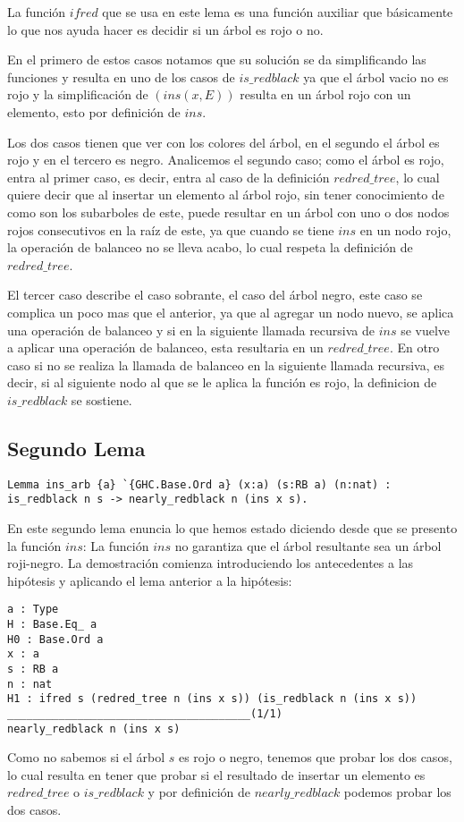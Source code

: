 \documentclass[letterpaper,12pt,oneside]{book}
\newcommand{\arn}{árbol roji-negro}
\theoremstyle{plain}
\theoremstyle{definition}
\theoremstyle{remark}
\begin{document}
 La funci\'on $ifred$ que se usa en este lema es una funci\'on auxiliar que b\'asicamente lo que nos ayuda hacer es decidir si un \'arbol es 
 rojo o no. 

 En el primero de estos casos notamos que su soluci\'on se da simplificando las funciones y resulta en uno de los casos
 de $is\_redblack$ ya que el \'arbol vacio no es rojo y la simplificaci\'on de $(ins(x,E))$ resulta en un \'arbol rojo con un elemento,
 esto por definici\'on de $ins$.

 Los dos casos tienen que ver con los colores del \'arbol, en el segundo el \'arbol es rojo y en el tercero es negro.
 Analicemos el segundo caso; como el \'arbol es rojo, entra al primer caso, es decir, entra al caso de la definici\'on $redred\_tree$,
 lo cual quiere decir que al insertar un elemento al \'arbol rojo, sin tener conocimiento de como son los subarboles de este, puede
 resultar en un \'arbol con uno o dos nodos rojos consecutivos en la ra\'iz de este, ya que cuando se tiene $ins$ en un nodo rojo, la operaci\'on de 
 balanceo no se lleva acabo, lo cual respeta la definici\'on de $redred\_tree$.

 El tercer caso describe el caso sobrante, el caso del \'arbol negro, este caso se complica un poco mas que el anterior, ya que al 
 agregar un nodo nuevo, se aplica una operaci\'on de balanceo y si en la siguiente llamada recursiva de $ins$ se vuelve a aplicar una operaci\'on 
 de balanceo, esta resultaria en un $redred\_tree$. En otro caso si no se realiza la llamada de balanceo en la siguiente llamada recursiva, es decir, si al siguiente nodo al que se le aplica la funci\'on es rojo, la definicion de $is\_redblack$ se sostiene.
\subsection{Segundo Lema}
\begin{verbatim}
Lemma ins_arb {a} `{GHC.Base.Ord a} (x:a) (s:RB a) (n:nat) : 
is_redblack n s -> nearly_redblack n (ins x s).
\end{verbatim}
En este segundo lema enuncia lo que hemos estado diciendo desde que se presento la funci\'on $ins$: La funci\'on $ins$ no garantiza que el \'arbol 
resultante sea un {{{\arn}}}. La demostraci\'on comienza introduciendo los antecedentes a las hipótesis y aplicando el lema anterior a la hip\'otesis:
\begin{verbatim}
a : Type
H : Base.Eq_ a
H0 : Base.Ord a
x : a
s : RB a
n : nat
H1 : ifred s (redred_tree n (ins x s)) (is_redblack n (ins x s))
______________________________________(1/1)
nearly_redblack n (ins x s)
\end{verbatim}
Como no sabemos si el \'arbol $s$ es rojo o negro, tenemos que probar los dos casos, lo cual resulta en tener que probar si el resultado de insertar un elemento
es $redred\_tree$ o $is\_redblack$ y por definici\'on  de $nearly\_redblack$ podemos probar los dos casos.
\end{document}
